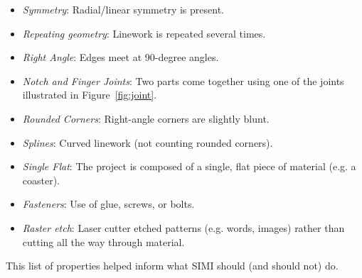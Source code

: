 \begin{itemize}
\item \textit{Symmetry}: Radial/linear symmetry is present.
\item \textit{Repeating geometry}: Linework is repeated several times.
\item \textit{Right Angle}: Edges meet at 90-degree angles.
\item \textit{Notch and Finger Joints}: Two parts come together using one of
  the joints illustrated in Figure~\ref{fig:joint}.
\item \textit{Rounded Corners}: Right-angle corners are slightly blunt.
\item \textit{Splines}: Curved linework (not counting rounded corners).
\item \textit{Single Flat}: The project is composed of a single, flat
  piece of material (e.g. a coaster).
\item \textit{Fasteners}: Use of glue, screws, or bolts.
\item \textit{Raster etch}: Laser cutter etched patterns (e.g. words,
  images) rather than cutting all the way through material.
\end{itemize}

This list of properties helped inform what SIMI should (and should
not) do. 






